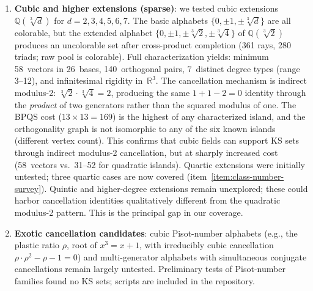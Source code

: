 \documentclass[12pt,a4paper]{article}
\newcommand{\R}{\mathbb{R}}
\newcommand{\Q}{\mathbb{Q}}
\begin{document}
\begin{enumerate}
    \item \textbf{Cubic and higher extensions (sparse)}: we tested cubic extensions $\Q(\sqrt[3]{d})$ for $d = 2, 3, 4, 5, 6, 7$. The basic alphabets $\{0,\pm 1,\pm\sqrt[3]{d}\}$ are all colorable, but the extended alphabet $\{0,\pm 1,\pm\sqrt[3]{2},\pm\sqrt[3]{4}\}$ of $\Q(\sqrt[3]{2})$ produces an uncolorable set after cross-product completion (361 rays, 280 triads; raw pool is colorable).  Full characterization yields: minimum 58~vectors in 26~bases, 140~orthogonal pairs, 7~distinct degree types (range 3--12), and infinitesimal rigidity in~$\R^3$.  The cancellation mechanism is indirect modulus-2: $\sqrt[3]{2} \cdot \sqrt[3]{4} = 2$, producing the same $1 + 1 - 2 = 0$ identity through the \emph{product} of two generators rather than the squared modulus of one.  The BPQS cost ($13 \times 13 = 169$) is the highest of any characterized island, and the orthogonality graph is not isomorphic to any of the six known islands (different vertex count).  This confirms that cubic fields can support KS sets through indirect modulus-2 cancellation, but at sharply increased cost (58~vectors vs.\ 31--52 for quadratic islands).  Quartic extensions were initially untested; three quartic cases are now covered (item~\ref{item:class-number-survey}).  Quintic and higher-degree extensions remain unexplored; these could harbor cancellation identities qualitatively different from the quadratic modulus-2 pattern.  This is the principal gap in our coverage.
    \item \textbf{Exotic cancellation candidates}: cubic Pisot-number alphabets (e.g., the plastic ratio $\rho$, root of $x^3 = x+1$, with irreducibly cubic cancellation $\rho \cdot \rho^2 - \rho - 1 = 0$) and multi-generator alphabets with simultaneous conjugate cancellations remain largely untested.  Preliminary tests of Pisot-number families found no KS sets; scripts are included in the repository.

\end{enumerate}
\end{document}
